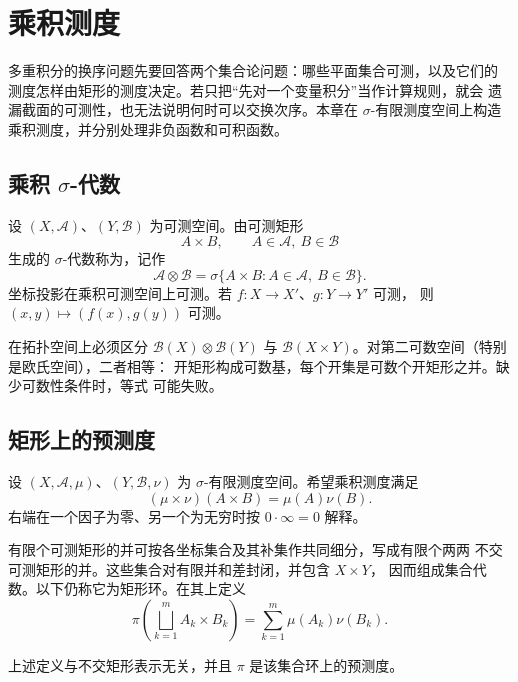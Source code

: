 \chapter{乘积测度}
\label{chap:product-measure}

多重积分的换序问题先要回答两个集合论问题：哪些平面集合可测，以及它们的
测度怎样由矩形的测度决定。若只把“先对一个变量积分”当作计算规则，就会
遗漏截面的可测性，也无法说明何时可以交换次序。本章在
\(\sigma\)-有限测度空间上构造乘积测度，并分别处理非负函数和可积函数。

\section{乘积 \texorpdfstring{\(\sigma\)}{sigma}-代数}

设 \((X,\mathcal A)\)、\((Y,\mathcal B)\) 为可测空间。由可测矩形
\[
 A\times B,\qquad A\in\mathcal A,\ B\in\mathcal B
\]
生成的 \(\sigma\)-代数称为，记作
\[
 \mathcal A\otimes\mathcal B
 =\sigma\{A\times B:A\in\mathcal A,\ B\in\mathcal B\}.
\]
坐标投影在乘积可测空间上可测。若 \(f:X\to X'\)、\(g:Y\to Y'\) 可测，
则 \((x,y)\mapsto(f(x),g(y))\) 可测。

在拓扑空间上必须区分
\(\mathcal B(X)\otimes\mathcal B(Y)\) 与
\(\mathcal B(X\times Y)\)。对第二可数空间（特别是欧氏空间），二者相等：
开矩形构成可数基，每个开集是可数个开矩形之并。缺少可数性条件时，等式
可能失败。

\section{矩形上的预测度}

设 \((X,\mathcal A,\mu)\)、\((Y,\mathcal B,\nu)\) 为
\(\sigma\)-有限测度空间。希望乘积测度满足
\[
 (\mu\times\nu)(A\times B)=\mu(A)\nu(B).
\]
右端在一个因子为零、另一个为无穷时按 \(0\cdot\infty=0\) 解释。

有限个可测矩形的并可按各坐标集合及其补集作共同细分，写成有限个两两
不交可测矩形的并。这些集合对有限并和差封闭，并包含 \(X\times Y\)，
因而组成集合代数。以下仍称它为矩形环。在其上定义
\[
 \pi\left(\bigsqcup_{k=1}^{m}A_k\times B_k\right)
 =\sum_{k=1}^{m}\mu(A_k)\nu(B_k).
\]

\begin{proposition}
\label{prop:rectangle-ring-premeasure}
上述定义与不交矩形表示无关，并且 \(\pi\) 是该集合环上的预测度。
\end{proposition}

